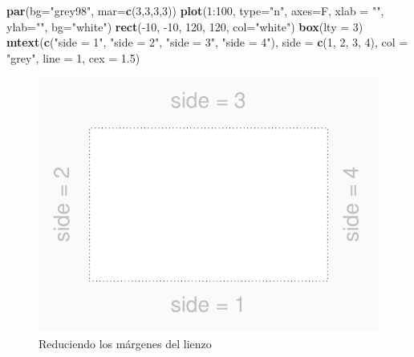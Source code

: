 \documentclass[]{article}
\newenvironment{Shaded}{\begin{snugshade}}{\end{snugshade}}
\newcommand{\KeywordTok}[1]{\textcolor[rgb]{0.13,0.29,0.53}{\textbf{{#1}}}}
\newcommand{\DataTypeTok}[1]{\textcolor[rgb]{0.13,0.29,0.53}{{#1}}}
\newcommand{\DecValTok}[1]{\textcolor[rgb]{0.00,0.00,0.81}{{#1}}}
\newcommand{\FloatTok}[1]{\textcolor[rgb]{0.00,0.00,0.81}{{#1}}}
\newcommand{\StringTok}[1]{\textcolor[rgb]{0.31,0.60,0.02}{{#1}}}
\newcommand{\NormalTok}[1]{{#1}}
\begin{document}
\begin{Shaded}
\begin{Highlighting}[]
\KeywordTok{par}\NormalTok{(}\DataTypeTok{bg=}\StringTok{"grey98"}\NormalTok{, }\DataTypeTok{mar=}\KeywordTok{c}\NormalTok{(}\DecValTok{3}\NormalTok{,}\DecValTok{3}\NormalTok{,}\DecValTok{3}\NormalTok{,}\DecValTok{3}\NormalTok{))}
\KeywordTok{plot}\NormalTok{(}\DecValTok{1}\NormalTok{:}\DecValTok{100}\NormalTok{, }\DataTypeTok{type=}\StringTok{"n"}\NormalTok{, }\DataTypeTok{axes=}\NormalTok{F, }\DataTypeTok{xlab =} \StringTok{""}\NormalTok{, }\DataTypeTok{ylab=}\StringTok{""}\NormalTok{, }\DataTypeTok{bg=}\StringTok{"white"}\NormalTok{)}
\KeywordTok{rect}\NormalTok{(-}\DecValTok{10}\NormalTok{, -}\DecValTok{10}\NormalTok{, }\DecValTok{120}\NormalTok{, }\DecValTok{120}\NormalTok{, }\DataTypeTok{col=}\StringTok{"white"}\NormalTok{)}
\KeywordTok{box}\NormalTok{(}\DataTypeTok{lty =} \DecValTok{3}\NormalTok{)}
\KeywordTok{mtext}\NormalTok{(}\KeywordTok{c}\NormalTok{(}\StringTok{"side = 1"}\NormalTok{, }\StringTok{"side = 2"}\NormalTok{, }\StringTok{"side = 3"}\NormalTok{, }\StringTok{"side = 4"}\NormalTok{),}
\DataTypeTok{side =} \KeywordTok{c}\NormalTok{(}\DecValTok{1}\NormalTok{, }\DecValTok{2}\NormalTok{, }\DecValTok{3}\NormalTok{, }\DecValTok{4}\NormalTok{), }\DataTypeTok{col =} \StringTok{"grey"}\NormalTok{, }\DataTypeTok{line =} \DecValTok{1}\NormalTok{, }\DataTypeTok{cex =} \FloatTok{1.5}\NormalTok{)}
\end{Highlighting}
\end{Shaded}

\begin{figure}

{\centering \includegraphics{index_files/figure-latex/unnamed-chunk-3-1} 

}

\caption{Reduciendo los márgenes del lienzo}\label{fig:unnamed-chunk-3}
\end{figure}
\end{document}
